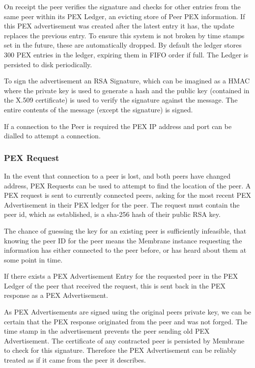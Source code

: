 \documentclass[11pt, a4paper, twoside]{report}
\begin{document}
On receipt the peer verifies the signature and checks for other entries from the same peer within its PEX Ledger, an evicting store of Peer PEX information. If this PEX advertisement was created after the latest entry it has, the update replaces the previous entry. To ensure this system is not broken by time stamps set in the future, these are automatically dropped. By default the ledger stores 300 PEX entries in the ledger, expiring them in FIFO order if full. The Ledger is persisted to disk periodically.

To sign the advertisement an RSA Signature, which can be imagined as a HMAC where the private key is used to generate a hash and the public key (contained in the X.509 certificate) is used to verify the signature against the message. The entire contents of the message (except the signature) is signed.

If a connection to the Peer is required the PEX IP address and port can be dialled to attempt a connection.

\subsubsection{PEX Request}

In the event that connection to a peer is lost, and both peers have changed address, PEX Requests can be used to attempt to find the location of the peer. A PEX request is sent to currently connected peers, asking for the most recent PEX Advertisement in their PEX ledger for the peer. The request must contain the peer id, which as established, is a sha-256 hash of their public RSA key.

The chance of guessing the key for an existing peer is sufficiently infeasible, that knowing the peer ID for the peer means the Membrane instance requesting the information has either connected to the peer before, or has heard about them at some point in time.

If there exists a PEX Advertisement Entry for the requested peer in the PEX Ledger of the peer that received the request, this is sent back in the PEX response as a PEX Advertisement.

As PEX Advertisements are signed using the original peers private key, we can be certain that the PEX response originated from the peer and was not forged. \citep{li1993remark} The time stamp in the advertisement prevents the peer sending old PEX Advertisement. The certificate of any contracted peer is persisted by Membrane to check for this signature. Therefore the PEX Advertisement can be reliably treated as if it came from the peer it describes.
\end{document}

